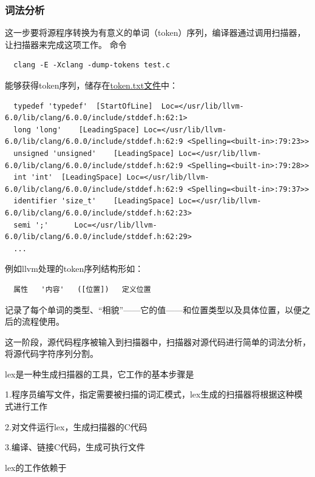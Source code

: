 \documentclass[UTF8,a4paper,10pt]{ctexart}
\begin{document}
\subsubsection{词法分析}
这一步要将源程序转换为有意义的单词（token）序列，编译器通过调用扫描器，让扫描器来完成这项工作。
命令
\begin{lstlisting}
  clang -E -Xclang -dump-tokens test.c
\end{lstlisting}
能够获得token序列，储存在\href{run:./test/token.txt}{token.txt文件}中：
\begin{lstlisting}
  typedef 'typedef'	 [StartOfLine]	Loc=</usr/lib/llvm-6.0/lib/clang/6.0.0/include/stddef.h:62:1>
  long 'long'	 [LeadingSpace]	Loc=</usr/lib/llvm-6.0/lib/clang/6.0.0/include/stddef.h:62:9 <Spelling=<built-in>:79:23>>
  unsigned 'unsigned'	 [LeadingSpace]	Loc=</usr/lib/llvm-6.0/lib/clang/6.0.0/include/stddef.h:62:9 <Spelling=<built-in>:79:28>>
  int 'int'	 [LeadingSpace]	Loc=</usr/lib/llvm-6.0/lib/clang/6.0.0/include/stddef.h:62:9 <Spelling=<built-in>:79:37>>
  identifier 'size_t'	 [LeadingSpace]	Loc=</usr/lib/llvm-6.0/lib/clang/6.0.0/include/stddef.h:62:23>
  semi ';'		Loc=</usr/lib/llvm-6.0/lib/clang/6.0.0/include/stddef.h:62:29>
  ...
\end{lstlisting}
\par
例如llvm处理的token序列结构形如：
\begin{lstlisting}
  属性   '内容'   ([位置])   定义位置
\end{lstlisting}
记录了每个单词的类型、“相貌”——它的值——和位置类型以及具体位置，以便之后的流程使用。
\par
这一阶段，源代码程序被输入到扫描器中，扫描器对源代码进行简单的词法分析，将源代码字符序列分割。
\par
lex是一种生成扫描器的工具，它工作的基本步骤是
\par
1.程序员编写文件，指定需要被扫描的词汇模式，lex生成的扫描器将根据这种模式进行工作
\par
2.对文件运行lex，生成扫描器的C代码
\par
3.编译、链接C代码，生成可执行文件
\par
lex的工作依赖于
\end{document}
